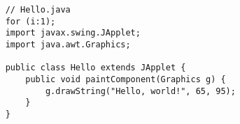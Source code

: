 \documentclass[12pt,a4paper]{article}
\begin{document}
	
	
	\begin{lstlisting}
	// Hello.java
	for (i:1);
	import javax.swing.JApplet;
	import java.awt.Graphics;

	public class Hello extends JApplet {
    	public void paintComponent(Graphics g) {
        	g.drawString("Hello, world!", 65, 95);
    	}    
	}
	\end{lstlisting}
	
\end{document}

